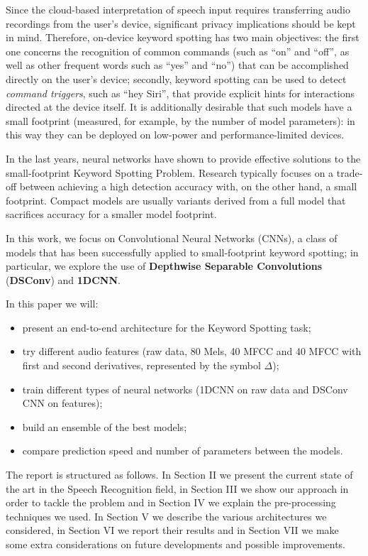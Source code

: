 \documentclass[conference]{IEEEtran}
\begin{document}
Since the cloud-based interpretation of speech input requires transferring audio recordings from the user’s device, significant privacy implications should be kept in mind. Therefore, on-device keyword spotting has two main objectives: the first one concerns the recognition of common commands (such as “on” and “off”, as well as other frequent words such as “yes” and “no”) that can be accomplished directly on the user’s device; secondly, keyword spotting can be used to detect \textit{command triggers}, such as “hey Siri”, that provide explicit hints for interactions directed at the device itself. It is additionally desirable that such models have a small footprint (measured, for example, by the number of model parameters): in this way they can be deployed on low-power and performance-limited devices.

In the last years, neural networks have shown to provide effective solutions to the small-footprint Keyword Spotting Problem. Research typically focuses on a trade-off between achieving a high detection accuracy with, on the other hand, a small footprint. Compact models are usually variants derived from a full model that sacrifices accuracy for a smaller model footprint.

In this work, we focus on Convolutional Neural Networks (CNNs), a class of models that has been successfully applied to small-footprint keyword spotting; in particular, we explore the use of \textbf{Depthwise Separable Convolutions} (\textbf{DSConv}) and \textbf{1DCNN}.

In this paper we will: 
\begin{itemize}
\setlength{\itemsep}{0pt}
  \setlength{\parskip}{0pt}
  \setlength{\parsep}{0pt}
\item present an end-to-end architecture for the Keyword Spotting task;
\item try different audio features (raw data, 80 Mels, 40 MFCC and 40 MFCC with first and second derivatives, represented by the symbol $\Delta$);
\item train different types of neural networks (1DCNN on raw data and DSConv CNN on features);
\item build an ensemble of the best models;
\item compare prediction speed and number of parameters between the models.
\end{itemize}

The report is structured as follows. In Section II we present the current state of the art in the Speech Recognition field, in Section III we show our approach in order to tackle the problem and in Section IV we explain the pre-processing techniques we used. In Section V we describe the various architectures we considered, in Section VI we report their results and in Section VII we make some extra considerations on future developments and possible improvements.
\end{document}
